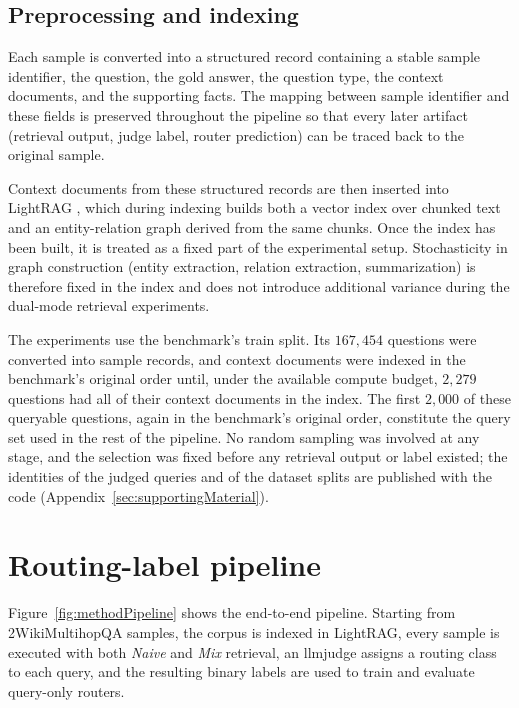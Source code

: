 \documentclass[english, bibtex]{kththesis}               %
\numberwithin{listing}{chapter}
\begin{document}
\subsection{Preprocessing and indexing}
\label{sec:methodPreprocessing}

Each sample is converted into a structured record containing a stable sample identifier, the question, the gold answer, the question type, the context documents, and the supporting facts. The mapping between sample identifier and these fields is preserved throughout the pipeline so that every later artifact (retrieval output, judge label, router prediction) can be traced back to the original sample.

Context documents from these structured records are then inserted into LightRAG \cite{lightrag2024}, which during indexing builds both a vector index over chunked text and an entity-relation graph derived from the same chunks. Once the index has been built, it is treated as a fixed part of the experimental setup. Stochasticity in graph construction (entity extraction, relation extraction, summarization) is therefore fixed in the index and does not introduce additional variance during the dual-mode retrieval experiments.

The experiments use the benchmark's train split. Its $167{,}454$ questions were converted into sample records, and context documents were indexed in the benchmark's original order until, under the available compute budget, $2{,}279$ questions had all of their context documents in the index. The first $2{,}000$ of these queryable questions, again in the benchmark's original order, constitute the query set used in the rest of the pipeline. No random sampling was involved at any stage, and the selection was fixed before any retrieval output or label existed; the identities of the judged queries and of the dataset splits are published with the code (Appendix~\ref{sec:supportingMaterial}).

\section{Routing-label pipeline}
\label{sec:methodPipeline}

Figure~\ref{fig:methodPipeline} shows the end-to-end pipeline. Starting from 2WikiMultihopQA samples, the corpus is indexed in LightRAG, every sample is executed with both \emph{Naive} and \emph{Mix} retrieval, an \gls{llmjudge} assigns a routing class to each query, and the resulting binary labels are used to train and evaluate query-only routers.
\end{document}
